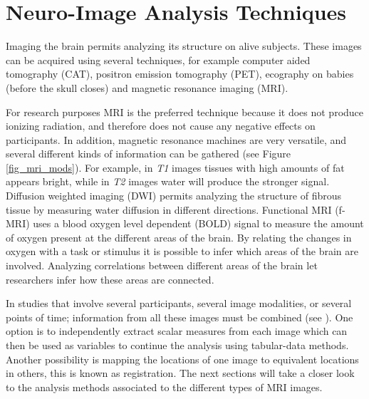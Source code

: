 

\section{Neuro-Image Analysis Techniques}

Imaging the brain permits analyzing its structure on alive subjects. These images can be acquired using several techniques, for example computer aided tomography (CAT), positron emission tomography (PET), ecography on babies (before the skull closes) and magnetic resonance imaging (MRI). 

For research purposes MRI is the preferred technique because it does not produce ionizing radiation, and therefore does not cause any negative effects on participants. In addition, magnetic resonance machines are very versatile, and several different kinds of information can be gathered (see Figure \ref{fig_mri_mods}). For example, in \emph{T1} images tissues with high amounts of fat appears bright, while in \emph{T2} images water will produce the stronger signal. Diffusion weighted imaging (DWI) permits analyzing the structure of fibrous tissue by measuring water diffusion in different directions. Functional MRI (f-MRI) uses a blood oxygen level dependent (BOLD) signal to measure the amount of oxygen present at the different areas of the brain. By relating the changes in oxygen with a task or stimulus it is possible to infer which areas of the brain are involved. Analyzing correlations between different areas of the brain let researchers infer how these areas are connected.

In studies that involve several participants, several image modalities, or several points of time; information from all these images must be combined (see \autocite{botha_individual_2012}). One option is to independently extract scalar measures from each image which can then be used as variables to continue the analysis using tabular-data methods. Another possibility is mapping the locations of one image to equivalent locations in others, this is known as registration. The next sections will take a closer look to the analysis methods associated to the different types of MRI images.

